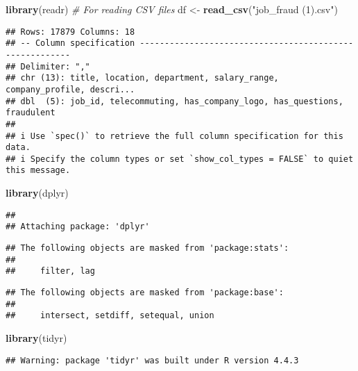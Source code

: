 \documentclass[
]{article}
\author{}
\date{\vspace{-2.5em}}
\newenvironment{Shaded}{\begin{snugshade}}{\end{snugshade}}
\newcommand{\CommentTok}[1]{\textcolor[rgb]{0.56,0.35,0.01}{\textit{#1}}}
\newcommand{\FunctionTok}[1]{\textcolor[rgb]{0.13,0.29,0.53}{\textbf{#1}}}
\newcommand{\NormalTok}[1]{#1}
\newcommand{\OtherTok}[1]{\textcolor[rgb]{0.56,0.35,0.01}{#1}}
\newcommand{\StringTok}[1]{\textcolor[rgb]{0.31,0.60,0.02}{#1}}
\begin{document}
\begin{Shaded}
\begin{Highlighting}[]
\FunctionTok{library}\NormalTok{(readr)      }\CommentTok{\# For reading CSV files}
\NormalTok{df }\OtherTok{\textless{}{-}} \FunctionTok{read\_csv}\NormalTok{(}\StringTok{"job\_fraud (1).csv"}\NormalTok{)}
\end{Highlighting}
\end{Shaded}

\begin{verbatim}
## Rows: 17879 Columns: 18
## -- Column specification --------------------------------------------------------
## Delimiter: ","
## chr (13): title, location, department, salary_range, company_profile, descri...
## dbl  (5): job_id, telecommuting, has_company_logo, has_questions, fraudulent
## 
## i Use `spec()` to retrieve the full column specification for this data.
## i Specify the column types or set `show_col_types = FALSE` to quiet this message.
\end{verbatim}

\begin{Shaded}
\begin{Highlighting}[]
\FunctionTok{library}\NormalTok{(dplyr)}
\end{Highlighting}
\end{Shaded}

\begin{verbatim}
## 
## Attaching package: 'dplyr'
\end{verbatim}

\begin{verbatim}
## The following objects are masked from 'package:stats':
## 
##     filter, lag
\end{verbatim}

\begin{verbatim}
## The following objects are masked from 'package:base':
## 
##     intersect, setdiff, setequal, union
\end{verbatim}

\begin{Shaded}
\begin{Highlighting}[]
\FunctionTok{library}\NormalTok{(tidyr)}
\end{Highlighting}
\end{Shaded}

\begin{verbatim}
## Warning: package 'tidyr' was built under R version 4.4.3
\end{verbatim}
\end{document}
